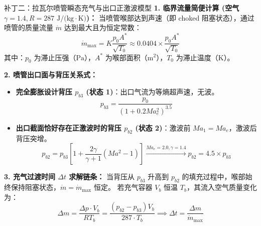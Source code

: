 \documentclass[11pt,a4paper]{article}
\begin{document}
\begin{patchbox}{补丁二：拉瓦尔喷管瞬态充气与出口正激波模型}
\textbf{1. 临界流量简便计算 (空气 $\gamma = 1.4, R = 287 \text{ J/(kg}\cdot\text{K)}$)：}
当喷管喉部达到声速（即 choked 阻塞状态），通过喷管的质量流量 $\dot{m}$ 达到最大且为恒定常数：
\begin{equation}
    \dot{m}_{\text{max}} = K \frac{p_0 A^*}{\sqrt{T_0}} \approx \mathbf{0.0404} \times \frac{p_0 A^*}{\sqrt{T_0}}
\end{equation}
其中：$p_0$ 为滞止压强（$\text{Pa}$），$A^*$ 为喉部面积（$\text{m}^2$），$T_0$ 为滞止温度（$\text{K}$）。

\textbf{2. 喷管出口面与背压关系式：}
\begin{itemize}
    \item \textbf{完全膨胀设计背压 $p_{b3}$ (状态 1)}：出口气流为等熵超声速，无波。
    \begin{equation}
        p_{b3} = \frac{p_0}{(1 + 0.2 Ma_e^2)^{3.5}}
    \end{equation}
    \item \textbf{出口截面恰好存在正激波时的背压 $p_{b2}$ (状态 2)}：激波前 $Ma_1 = Ma_e$，激波后背压突增。
    \begin{equation}
        p_{b2} = p_{b3} \left[ 1 + \frac{2\gamma}{\gamma + 1} \left( Ma^2 - 1 \right) \right] \xrightarrow{Ma_e=2.0, \gamma=1.4} p_{b2} = 4.5 \times p_{b3}
    \end{equation}
\end{itemize}

\textbf{3. 充气过渡时间 $\Delta t$ 求解链条：}
当背压从 $p_{b3}$ 升高到 $p_{b2}$ 的填充过程中，喉部始终保持阻塞状态，$\dot{m} = \dot{m}_{\text{max}}$ 恒定。
若充气容器 $V_b$ 恒温 $T_b$，其流入空气质量变化为：
\begin{equation}
    \Delta m = \frac{\Delta p \cdot V_b}{R T_b} = \frac{(p_{b2} - p_{b3}) V_b}{287 \cdot T_b} \implies \Delta t = \frac{\Delta m}{\dot{m}_{\text{max}}}
\end{equation}
\end{patchbox}
\end{document}
